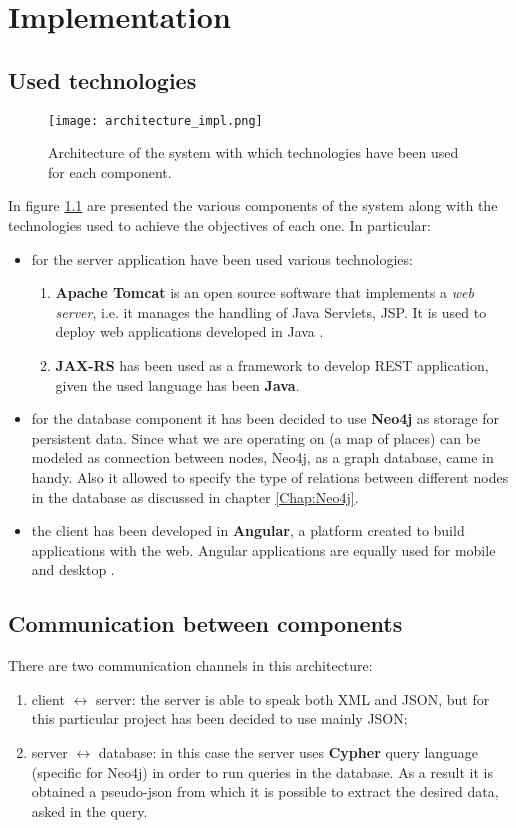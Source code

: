 \chapter{Implementation}\label{Chap:Impl}
\section{Used technologies}
\begin{figure}[!htb]
   \centering
   \texttt{[image: architecture\_impl.png]}
   \caption{Architecture of the system with which technologies have been used for each component.}\label{Fig:ArchImpl}
\end{figure}
In figure \ref{Fig:ArchImpl} are presented the various components of the system along with the technologies used to achieve the objectives of each one. In particular:
\begin{itemize}
  \item for the server application have been used various technologies:
    \begin{enumerate}
      \item \textbf{Apache Tomcat} is an open source software that implements a \textit{web server}, i.e. it manages the handling of Java Servlets, JSP. It is used to deploy web applications developed in Java \parencite{tomcat}.
      \item \textbf{JAX-RS} has been used as a framework to develop REST application, given the used language has been \textbf{Java}.
    \end{enumerate}
  \item for the database component it has been decided to use \textbf{Neo4j} as storage for persistent data. Since what we are operating on (a map of places) can be modeled as connection between nodes, Neo4j, as a graph database, came in handy. Also it allowed to specify the type of relations between different nodes in the database as discussed in chapter \ref{Chap:Neo4j}.
  \item the client has been developed in \textbf{Angular}, a platform created to build applications with the web. Angular applications are equally used for mobile and desktop \cite{angular}.
\end{itemize}


\section{Communication between components}
There are two communication channels in this architecture:
\begin{enumerate}
  \item client $\leftrightarrow$ server: the server is able to speak both XML and JSON, but for this particular project has been decided to use mainly JSON;
  \item server $\leftrightarrow$ database: in this case the server uses \textbf{Cypher} query language (specific for Neo4j) in order to run queries in the database. As a result it is obtained a pseudo-json from which it is possible to extract the desired data, asked in the query.
\end{enumerate}

